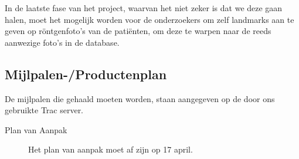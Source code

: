 In de laatste fase van het project, waarvan het niet zeker is dat we deze gaan halen, moet het mogelijk worden voor de onderzoekers om zelf landmarks aan te geven op r\"ontgenfoto's van de pati\"enten, om deze te warpen naar de reeds aanwezige foto's in de database.

\subsection{Mijlpalen-/Productenplan}
De mijlpalen die gehaald moeten worden, staan aangegeven op de door ons gebruikte Trac server.
\begin{description}
	\item[Plan van Aanpak] Het plan van aanpak moet af zijn op 17 april.
\end{description}

